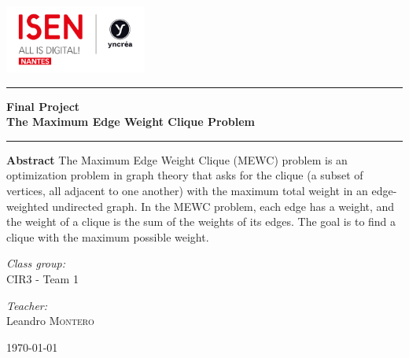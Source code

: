 
\begin{center}
    \includegraphics[width=0.35\textwidth]{image/ISEN.png}
\end{center}

\rule{\linewidth}{0.5mm}

\begin{center}
    \Huge \bf Final Project \\
    \LARGE \bf The Maximum Edge Weight Clique Problem
\end{center}

\rule{\linewidth}{0.5mm}

\vspace{1\baselineskip}

\begin{center}
\end{center}
\large\textbf{Abstract} \newline
The Maximum Edge Weight Clique (MEWC) problem is an optimization problem in
graph theory that asks for the clique (a subset of vertices, all adjacent to
one another) with the maximum total weight in an edge-weighted undirected graph.
In the MEWC problem, each edge has a weight, and the weight of a clique is the
sum of the weights of its edges. The goal is to find a clique with the maximum
possible weight.

\begin{center} \Large
    \emph{Class group:} \\
    CIR3 - Team 1
\end{center}

\begin{center} \Large
    \emph{Teacher:} \\
    Leandro \textsc{Montero}
\end{center}

\vfill

\begin{center} \Large
    \today
\end{center}
